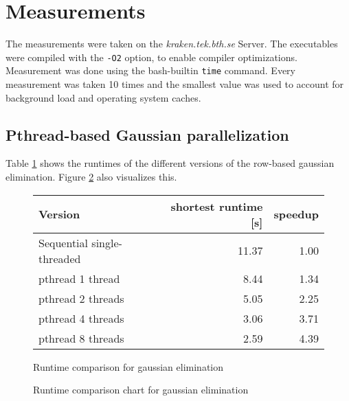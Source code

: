 \documentclass[]{article}
\begin{document}
\section{Measurements}

The measurements were taken on the \emph{kraken.tek.bth.se} Server. The executables were compiled with the \texttt{-O2} option, to enable compiler optimizations. Measurement was done using the bash-builtin \texttt{time} command. Every measurement was taken 10 times and the smallest value was used to account for background load and operating system caches.

\subsection{Pthread-based Gaussian parallelization}

Table \ref{tab:gauss-runtime} shows the runtimes of the different versions of the row-based gaussian elimination. Figure \ref{fig:gauss-chart} also visualizes this.

\begin{figure}[h]
	\centering
	\begin{tabular}{|l|r|r|}
		\hline
		\textbf{Version} & \textbf{shortest runtime [s]} & \textbf{speedup} \\
		\hline
		Sequential single-threaded		& 11.37 & 1.00 \\ 
		\hline 
		pthread 1 thread				& 8.44 & 1.34 \\ 
		\hline 
		pthread 2 threads				& 5.05 & 2.25 \\ 
		\hline 
		pthread 4 threads 				& 3.06 & 3.71 \\ 
		\hline 
		pthread 8 threads				& 2.59 & 4.39 \\ 
		\hline 
	\end{tabular} 
	\caption{Runtime comparison for gaussian elimination}
	\label{tab:gauss-runtime}
\end{figure}

\begin{figure}[h]
	\centering
	\caption{Runtime comparison chart for gaussian elimination}
	\label{fig:gauss-chart}
\end{figure}
\end{document}
